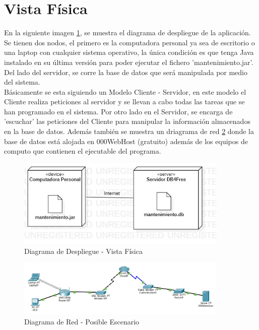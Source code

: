 \section{Vista Física}
En la siguiente imagen \ref{fig:Diagrama de Despliegue - Vista Física}, se muestra el diagrama de despliegue de la aplicación. Se tienen dos nodos, el primero es la computadora personal ya sea de escritorio o una laptop con cualquier sistema operativo, la única condición es que tenga Java instalado en su última versión para poder ejecutar el fichero 'mantenimiento.jar'. Del lado del servidor, se corre la base de datos que será manipulada por medio del sistema. 
\\
Básicamente se esta siguiendo un Modelo Cliente - Servidor, en este modelo el Cliente realiza peticiones al servidor y se llevan a cabo todas las tareas que se han programado en el sistema. Por otro lado en el Servidor, se encarga de 'escuchar' las peticiones del Cliente para manipular la información almacenados en la base de datos. Además también se muestra un driagrama de red \ref{fig:Diagrama de Red - Posible Escenario} donde la base de datos está alojada en 000WebHost (gratuito) además de los equipos de computo que contienen el ejecutable del programa.
\begin{figure}[!h]
	\centering
	\includegraphics[width=0.9\textwidth]{./diseno/vfisica/imagenes/vistaFisica}
	\caption{Diagrama de Despliegue - Vista Física}
	\label{fig:Diagrama de Despliegue - Vista Física}
\end{figure}

\begin{figure}[!h]
	\centering
	\includegraphics[width=0.9\textwidth]{./diseno/vfisica/imagenes/diagramaRed}
	\caption{Diagrama de Red - Posible Escenario}
	\label{fig:Diagrama de Red - Posible Escenario}
\end{figure}